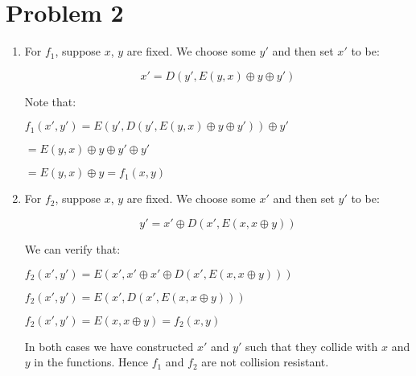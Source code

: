 \documentclass{article}
\begin{document}
\section*{Problem 2}
\begin{enumerate}
\item %
For $f_1$, suppose $x$, $y$ are fixed. We choose some $y'$ and then set $x'$ to be:

$$x' = D(y', E(y, x) \oplus y \oplus y')$$

Note that:

$f_1 (x', y') = E(y', D(y', E(y, x) \oplus y \oplus y')) \oplus y'$

$= E(y, x) \oplus y \oplus y' \oplus y'$

$= E(y, x) \oplus y = f_1(x, y)$

\item %

For $f_2$, suppose $x$, $y$ are fixed. We choose some $x'$ and then set $y'$ to be:

$$y' = x' \oplus D(x', E(x, x \oplus y))$$

We can verify that:

$f_2 (x', y') = E(x', x' \oplus x' \oplus D(x', E(x, x \oplus y)))$

$f_2 (x', y') = E(x', D(x', E(x, x \oplus y)))$

$f_2 (x', y') = E(x, x \oplus y) = f_2(x, y)$

In both cases we have constructed $x'$ and $y'$ such that they collide with $x$ and $y$ in the functions. Hence $f_1$ and $f_2$ are not collision resistant.


\end{enumerate}
\end{document}
